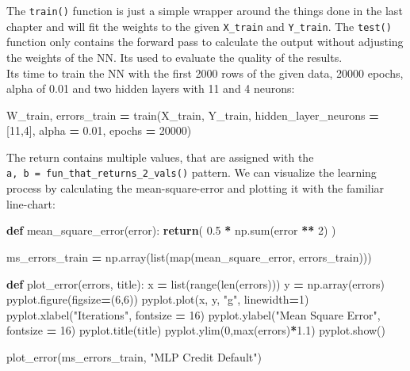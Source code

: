 \documentclass[
]{book}
\newenvironment{Shaded}{\begin{snugshade}}{\end{snugshade}}
\newcommand{\BuiltInTok}[1]{#1}
\newcommand{\ControlFlowTok}[1]{\textcolor[rgb]{0.13,0.29,0.53}{\textbf{#1}}}
\newcommand{\DecValTok}[1]{\textcolor[rgb]{0.00,0.00,0.81}{#1}}
\newcommand{\FloatTok}[1]{\textcolor[rgb]{0.00,0.00,0.81}{#1}}
\newcommand{\KeywordTok}[1]{\textcolor[rgb]{0.13,0.29,0.53}{\textbf{#1}}}
\newcommand{\NormalTok}[1]{#1}
\newcommand{\OperatorTok}[1]{\textcolor[rgb]{0.81,0.36,0.00}{\textbf{#1}}}
\newcommand{\StringTok}[1]{\textcolor[rgb]{0.31,0.60,0.02}{#1}}
\begin{document}
The \texttt{train()} function is just a simple wrapper around the things done in the last chapter and will fit the weights to the given \texttt{X\_train} and \texttt{Y\_train}. The \texttt{test()} function only contains the forward pass to calculate the output without adjusting the weights of the NN. Its used to evaluate the quality of the results.\\
Its time to train the NN with the first 2000 rows of the given data, 20000 epochs, alpha of 0.01 and two hidden layers with 11 and 4 neurons:

\begin{Shaded}
\begin{Highlighting}[]
\NormalTok{W\_train, errors\_train }\OperatorTok{=}\NormalTok{ train(X\_train, Y\_train, hidden\_layer\_neurons }\OperatorTok{=}\NormalTok{ [}\DecValTok{11}\NormalTok{,}\DecValTok{4}\NormalTok{], alpha }\OperatorTok{=} \FloatTok{0.01}\NormalTok{, epochs }\OperatorTok{=} \DecValTok{20000}\NormalTok{)}
\end{Highlighting}
\end{Shaded}

The return contains multiple values, that are assigned with the \texttt{a,\ b\ =\ fun\_that\_returns\_2\_vals()} pattern. We can visualize the learning process by calculating the mean-square-error and plotting it with the familiar line-chart:

\begin{Shaded}
\begin{Highlighting}[]
\KeywordTok{def}\NormalTok{ mean\_square\_error(error):}
  \ControlFlowTok{return}\NormalTok{( }\FloatTok{0.5} \OperatorTok{*}\NormalTok{ np.}\BuiltInTok{sum}\NormalTok{(error }\OperatorTok{**} \DecValTok{2}\NormalTok{) )}

\NormalTok{ms\_errors\_train }\OperatorTok{=}\NormalTok{ np.array(}\BuiltInTok{list}\NormalTok{(}\BuiltInTok{map}\NormalTok{(mean\_square\_error, errors\_train)))}

\KeywordTok{def}\NormalTok{ plot\_error(errors, title):}
\NormalTok{  x }\OperatorTok{=} \BuiltInTok{list}\NormalTok{(}\BuiltInTok{range}\NormalTok{(}\BuiltInTok{len}\NormalTok{(errors)))}
\NormalTok{  y }\OperatorTok{=}\NormalTok{ np.array(errors)}
\NormalTok{  pyplot.figure(figsize}\OperatorTok{=}\NormalTok{(}\DecValTok{6}\NormalTok{,}\DecValTok{6}\NormalTok{))}
\NormalTok{  pyplot.plot(x, y, }\StringTok{"g"}\NormalTok{, linewidth}\OperatorTok{=}\DecValTok{1}\NormalTok{)}
\NormalTok{  pyplot.xlabel(}\StringTok{"Iterations"}\NormalTok{, fontsize }\OperatorTok{=} \DecValTok{16}\NormalTok{)}
\NormalTok{  pyplot.ylabel(}\StringTok{"Mean Square Error"}\NormalTok{, fontsize }\OperatorTok{=} \DecValTok{16}\NormalTok{)}
\NormalTok{  pyplot.title(title)}
\NormalTok{  pyplot.ylim(}\DecValTok{0}\NormalTok{,}\BuiltInTok{max}\NormalTok{(errors)}\OperatorTok{*}\FloatTok{1.1}\NormalTok{)}
\NormalTok{  pyplot.show()}
  
\NormalTok{plot\_error(ms\_errors\_train, }\StringTok{"MLP Credit Default"}\NormalTok{)}
\end{Highlighting}
\end{Shaded}
\end{document}
